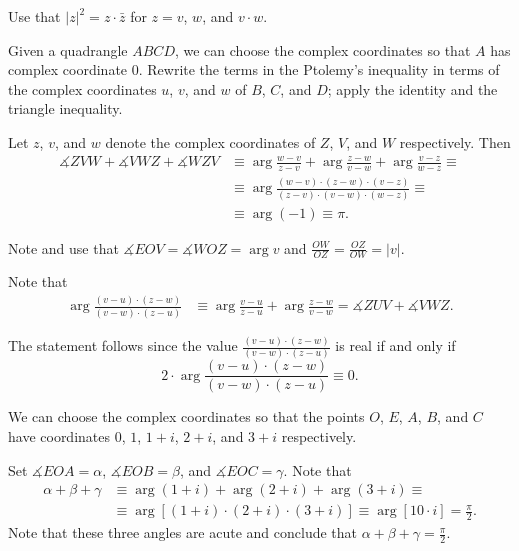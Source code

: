 \setcounter{eqtn}{0}

 Use that $|z|^2=z\cdot \bar z$ for $z=v$, $w$, and $v\cdot w$.

 Given a quadrangle $ABCD$, we can choose the complex coordinates so that $A$ has complex coordinate $0$. 
Rewrite the terms in the Ptolemy's inequality in terms of the complex coordinates $u$, $v$, and $w$ of $B$, $C$, and $D$; apply the identity and the triangle inequality.


Let $z$, $v$, and $w$ denote the complex coordinates of $Z$, $V$, and $W$ respectively.
Then 
\begin{align*}
\measuredangle ZVW+\measuredangle VWZ+\measuredangle WZV
&\equiv
\arg \tfrac{w-v}{z-v}+\arg \tfrac{z-w}{v-w}+\arg \tfrac{v-z}{w-z}\equiv
\\
&\equiv
\arg \tfrac{(w-v)\cdot(z-w)\cdot(v-z)}{(z-v)\cdot(v-w)\cdot(w-z)}\equiv
\\
&\equiv\arg (-1)\equiv
\pi.
\end{align*}

Note and use that 
$
\measuredangle EOV=\measuredangle WOZ=\arg v$
and
$\frac{OW}{OZ}=\frac{OZ}{OW}=|v|$.


Note that 
\begin{align*}
\arg\frac{(v-u)\cdot(z-w)}{(v-w)\cdot(z-u)}
&\equiv
\arg\frac{v-u}{z-u}
+
\arg\frac{z-w}{v-w}=
 \measuredangle ZUV+\measuredangle VWZ.
\end{align*}

The statement follows since the value $\tfrac{(v-u)\cdot(z-w)}{(v-w)\cdot(z-u)}$ is real if and only if 
\[2\cdot\arg\frac{(v-u)\cdot(z-w)}{(v-w)\cdot(z-u)}\equiv0.\]

We can choose the complex coordinates so that the points $O$, $E$, $A$, $B$, and $C$ have coordinates
$0$, $1$, $1+i$, $2+i$, and $3+i$ respectively.

Set $\measuredangle EOA=\alpha$, $\measuredangle EOB=\beta$, and $\measuredangle EOC=\gamma$.
Note that
\begin{align*}
\alpha+\beta+\gamma
&\equiv\arg(1+i)+\arg(2+i)+\arg(3+i)\equiv
\\
&\equiv\arg[(1+i)\cdot(2+i)\cdot(3+i)]\equiv\arg [10\cdot i]=\tfrac\pi2.
\end{align*}
Note that these three angles are acute and conclude that $\alpha+\beta+\gamma=\tfrac\pi2$.

